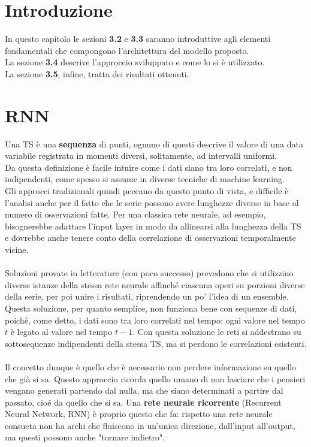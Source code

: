 \section{Introduzione}
In questo capitolo le sezioni \textbf{3.2} e \textbf{3.3} saranno introduttive agli elementi fondamentali che compongono l'architettura del modello proposto.\\
La sezione \textbf{3.4} descrive l'approccio sviluppato e come lo si è utilizzato.\\
La sezione \textbf{3.5}, infine, tratta dei risultati ottenuti.

\section{RNN}
Una TS è una \textbf{sequenza} di punti, ognuno di questi descrive il valore di una data variabile registrata in momenti diversi, solitamente, ad intervalli uniformi.\\
Da questa definizione è facile intuire come i dati siano tra loro correlati, e non indipendenti, come spesso si assume in diverse tecniche di machine learning.\\
Gli approcci tradizionali quindi peccano da questo punto di vista, e difficile è l'analisi anche per il fatto che le serie possono avere lunghezze diverse in base al numero di osservazioni fatte. Per una classica rete neurale, ad esempio, bisognerebbe adattare l'input layer in modo da allinearsi alla lunghezza della TS e dovrebbe anche tenere conto della correlazione di osservazioni temporalmente vicine.\\
\\
Soluzioni provate in letterature (con poco successo) prevedono che si utilizzino  diverse istanze della stessa rete neurale affinché ciascuna operi su porzioni diverse della serie, per poi unire i risultati, riprendendo un po' l'idea di un ensemble. \\
Questa soluzione, per quanto semplice, non funziona bene con sequenze di dati, poiché, come detto, i dati sono tra loro correlati nel tempo: ogni valore nel tempo $t$ è legato al valore nel tempo $t-1$. Con questa soluzione le reti si addestrano su sottosequenze indipendenti della stessa TS, ma si perdono le correlazioni esistenti.\\
\\
Il concetto dunque è quello che è necessario non perdere informazione su quello che già si  sa. Questo approccio ricorda quello umano di non lasciare che i pensieri vengano generati partendo dal nulla, ma che siano determinati a partire dal passato, cioé da quello che si sa. Una \textbf{rete neurale ricorrente} (Recurrent Neural Network, RNN) è proprio questo che fa: rispetto una rete neurale consueta non ha archi che fluiscono in un'unica direzione, dall'input all'output, ma questi possono anche "tornare indietro".
